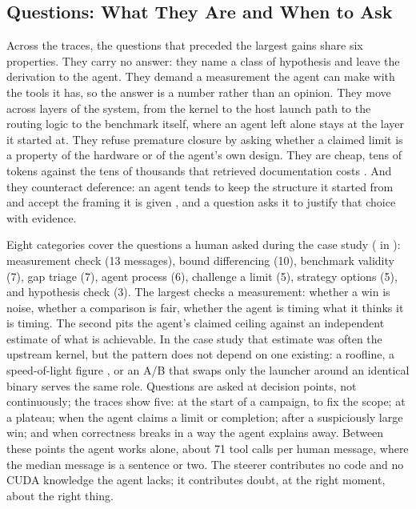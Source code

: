 \subsection{Questions: What They Are and When to Ask}
\label{kernelseek:sec:workflow-questions}
\label{kernelseek:sec:good-questions}
\label{kernelseek:sec:workflow-when}


Across the traces, the questions that preceded the largest gains share six properties. They carry
no answer: they name a class of hypothesis and leave the derivation to the agent. They demand a
measurement the agent can make with the tools it has, so the answer is a number rather than an
opinion. They move across layers of the system, from the kernel to the host launch path to the
routing logic to the benchmark itself, where an agent left alone stays at the layer it started at.
They refuse premature closure by asking whether a claimed limit is a property of the hardware or of
the agent's own design. They are cheap, tens of tokens against the tens of thousands that retrieved
documentation costs \cite{liu2024lost,langchain2025toolload}. And they counteract deference: an
agent tends to keep the structure it started from and accept the framing it is given
\cite{sharma2024sycophancy}, and a question asks it to justify that choice with evidence.

Eight categories cover the questions a human asked during the case study
( in ): measurement check (13 messages), bound
differencing (10), benchmark validity (7), gap triage (7), agent process (6), challenge a limit (5),
strategy options (5), and hypothesis check (3). The largest checks a measurement: whether a win is noise, whether a comparison is fair, whether the
agent is timing what it thinks it is timing. The second pits the agent's claimed ceiling against an
independent estimate of what is achievable. In the case study that estimate was often the upstream
kernel, but the pattern does not depend on one existing: a roofline, a speed-of-light figure
\cite{solexecbench}, or an A/B that swaps only the launcher around an identical binary serves
the same role. Questions are asked at
decision points, not continuously; the traces show five: at the start of a campaign, to fix the
scope; at a plateau; when the agent claims a limit or completion; after a suspiciously large win;
and when correctness breaks in a way the agent explains away. Between these points the agent works
alone, about 71 tool calls per human message, where the median message is a sentence or two. The
steerer contributes no code and no CUDA knowledge the agent lacks; it contributes doubt, at the right
moment, about the right thing.

